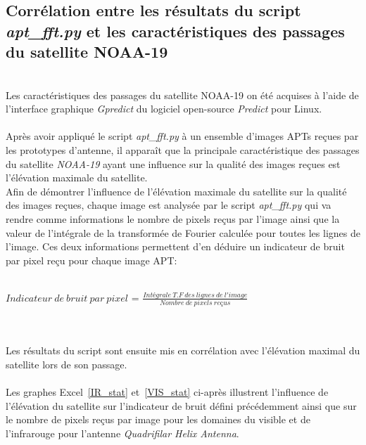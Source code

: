 \documentclass[12pt,fleqn]{book} %
\begin{document}
\subsection{Corrélation entre les résultats du script \emph{apt\_fft.py} et les caractéristiques des passages du satellite NOAA-19}
~\\Les caractéristiques des passages du satellite NOAA-19 on été acquises à l'aide de l'interface graphique \emph{Gpredict} du logiciel open-source \emph{Predict} pour Linux.
~\\\\Après avoir appliqué le script \emph{apt\_fft.py} à un ensemble d'images APTs reçues par les prototypes d'antenne, il apparaît que la principale caractéristique des passages du satellite \emph{NOAA-19} ayant une influence sur la qualité des images reçues est l'élévation maximale du satellite.
~\\Afin de démontrer l'influence de l'élévation maximale du satellite sur la qualité des images reçues, chaque image est analysée par le script \emph{apt\_fft.py} qui va rendre comme informations le nombre de pixels reçus par l'image ainsi que la valeur de l'intégrale de la transformée de Fourier calculée pour toutes les lignes de l'image.
Ces deux informations permettent d'en déduire un indicateur de bruit par pixel reçu pour chaque image APT:
~\\\\
\begin{center}
 $ Indicateur\ de\ bruit\ par\ pixel $ = $\frac{Intégrale\ T.F\ des\ lignes\ de\ l'image}{Nombre\ de\ pixels\ reçus} $
\end{center}
~\\\\
Les résultats du script sont ensuite mis en corrélation avec l'élévation maximal du satellite lors de son passage. 
~\\\\Les graphes Excel~\underline{\color{blue}\ref{IR_stat}} et~\underline{\color{blue}\ref{VIS_stat}} ci-après illustrent l'influence de l'élévation du satellite sur l'indicateur de bruit défini précédemment ainsi que sur le nombre de pixels reçus par image pour les domaines du visible et de l'infrarouge pour l'antenne \emph{Quadrifilar Helix Antenna}.
\end{document}
